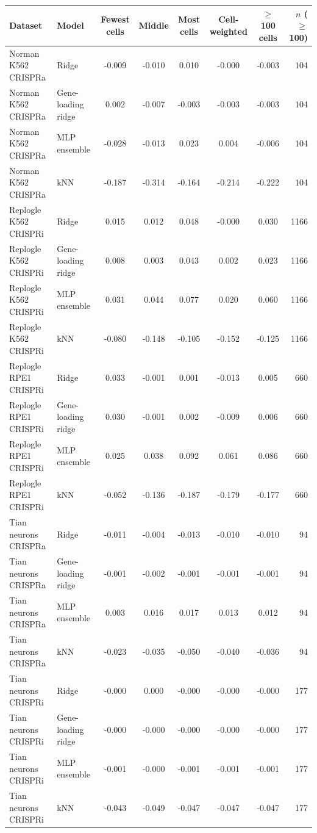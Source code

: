 \begin{tabular}{llcccccr}
\toprule
Dataset & Model & Fewest cells & Middle & Most cells & Cell-weighted & $\ge$100 cells & $n$ ($\ge$100) \\
\midrule
Norman K562 CRISPRa & Ridge & -0.009 & -0.010 & 0.010 & -0.000 & -0.003 & 104 \\
Norman K562 CRISPRa & Gene-loading ridge & 0.002 & -0.007 & -0.003 & -0.003 & -0.003 & 104 \\
Norman K562 CRISPRa & MLP ensemble & -0.028 & -0.013 & 0.023 & 0.004 & -0.006 & 104 \\
Norman K562 CRISPRa & kNN & -0.187 & -0.314 & -0.164 & -0.214 & -0.222 & 104 \\
Replogle K562 CRISPRi & Ridge & 0.015 & 0.012 & 0.048 & -0.000 & 0.030 & 1166 \\
Replogle K562 CRISPRi & Gene-loading ridge & 0.008 & 0.003 & 0.043 & 0.002 & 0.023 & 1166 \\
Replogle K562 CRISPRi & MLP ensemble & 0.031 & 0.044 & 0.077 & 0.020 & 0.060 & 1166 \\
Replogle K562 CRISPRi & kNN & -0.080 & -0.148 & -0.105 & -0.152 & -0.125 & 1166 \\
Replogle RPE1 CRISPRi & Ridge & 0.033 & -0.001 & 0.001 & -0.013 & 0.005 & 660 \\
Replogle RPE1 CRISPRi & Gene-loading ridge & 0.030 & -0.001 & 0.002 & -0.009 & 0.006 & 660 \\
Replogle RPE1 CRISPRi & MLP ensemble & 0.025 & 0.038 & 0.092 & 0.061 & 0.086 & 660 \\
Replogle RPE1 CRISPRi & kNN & -0.052 & -0.136 & -0.187 & -0.179 & -0.177 & 660 \\
Tian neurons CRISPRa & Ridge & -0.011 & -0.004 & -0.013 & -0.010 & -0.010 & 94 \\
Tian neurons CRISPRa & Gene-loading ridge & -0.001 & -0.002 & -0.001 & -0.001 & -0.001 & 94 \\
Tian neurons CRISPRa & MLP ensemble & 0.003 & 0.016 & 0.017 & 0.013 & 0.012 & 94 \\
Tian neurons CRISPRa & kNN & -0.023 & -0.035 & -0.050 & -0.040 & -0.036 & 94 \\
Tian neurons CRISPRi & Ridge & -0.000 & 0.000 & -0.000 & -0.000 & -0.000 & 177 \\
Tian neurons CRISPRi & Gene-loading ridge & -0.000 & -0.000 & -0.000 & -0.000 & -0.000 & 177 \\
Tian neurons CRISPRi & MLP ensemble & -0.001 & -0.000 & -0.001 & -0.001 & -0.001 & 177 \\
Tian neurons CRISPRi & kNN & -0.043 & -0.049 & -0.047 & -0.047 & -0.047 & 177 \\
\bottomrule
\end{tabular}